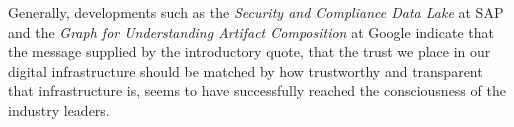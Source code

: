 Generally, developments such as the \emph{Security and Compliance Data Lake} at SAP and the \emph{Graph for Understanding Artifact Composition} at Google indicate that the message supplied by the introductory quote, that the trust we place in our digital infrastructure should be matched by how trustworthy and transparent that infrastructure is, seems to have successfully reached the consciousness of the industry leaders.



